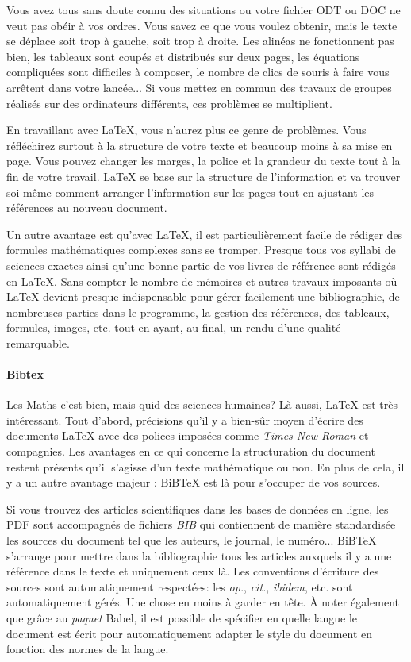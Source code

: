 Vous avez tous sans doute connu des situations ou votre fichier ODT ou DOC ne veut pas obéir à vos ordres. Vous savez ce que vous voulez obtenir, mais le texte se déplace soit trop à gauche, soit trop à droite. Les alinéas ne fonctionnent pas bien, les tableaux sont coupés et distribués sur deux pages, les équations compliquées sont difficiles à composer, le nombre de clics de souris à faire vous arrêtent dans votre lancée... Si vous mettez en commun des travaux de groupes réalisés sur des ordinateurs différents, ces problèmes se multiplient.

En travaillant avec \LaTeX{}, vous n'aurez plus ce genre de problèmes. Vous réfléchirez surtout à la structure de votre texte et beaucoup moins à sa mise en page. Vous pouvez changer les marges, la police et la grandeur du texte tout à la fin de votre travail. \LaTeX{} se base sur la structure de l'information et va trouver soi-même comment arranger l'information sur les pages tout en ajustant les références au nouveau document.

Un autre avantage est qu'avec \LaTeX{}, il est particulièrement facile de rédiger des formules mathématiques complexes sans se tromper. Presque tous vos syllabi de sciences exactes ainsi qu'une bonne partie de vos livres de référence sont rédigés en \LaTeX{}. Sans compter le nombre de mémoires et autres travaux imposants où \LaTeX{} devient presque indispensable pour gérer facilement une bibliographie, de nombreuses parties dans le programme, la gestion des références, des tableaux, formules, images, etc. tout en ayant, au final, un rendu d'une qualité remarquable.

\paragraph{Bibtex}
Les Maths c'est bien, mais quid des sciences humaines? Là aussi, \LaTeX{} est très intéressant. Tout d'abord, précisions qu'il y a bien-sûr moyen d'écrire des documents \LaTeX{} avec des polices imposées comme \textit{Times New Roman} et compagnies.
Les avantages en ce qui concerne la structuration du document restent présents qu'il s'agisse d'un texte mathématique ou non. En plus de cela, il y a un autre avantage majeur : BiB\TeX{} est là pour s'occuper de vos sources.

Si vous trouvez des articles scientifiques dans les bases de données en ligne, les PDF sont accompagnés de fichiers \textit{BIB} qui contiennent de manière standardisée les sources du document tel que les auteurs, le journal, le numéro... BiB\TeX{} s'arrange pour mettre dans la bibliographie tous les articles auxquels il y a une référence dans le texte et uniquement ceux là. Les conventions d'écriture des sources sont automatiquement respectées: les \textit{op.}, \textit{cit.}, \textit{ibidem}, etc. sont automatiquement gérés. Une chose en moins à garder en tête.
À noter également que grâce au \textit{paquet} Babel, il est possible de spécifier en quelle langue le document est écrit pour automatiquement adapter le style du document en fonction des normes de la langue.

